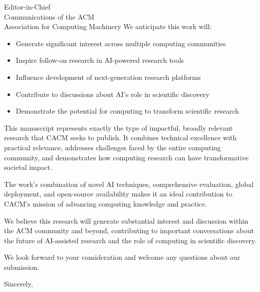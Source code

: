 \documentclass[11pt]{letter}
\begin{document}
\begin{letter}{Editor-in-Chief\\
Communications of the ACM\\
Association for Computing Machinery}
We anticipate this work will:

\begin{itemize}
    \item Generate significant interest across multiple computing communities
    \item Inspire follow-on research in AI-powered research tools
    \item Influence development of next-generation research platforms
    \item Contribute to discussions about AI's role in scientific discovery
    \item Demonstrate the potential for computing to transform scientific research
\end{itemize}

This manuscript represents exactly the type of impactful, broadly relevant research that CACM seeks to publish. It combines technical excellence with practical relevance, addresses challenges faced by the entire computing community, and demonstrates how computing research can have transformative societal impact.

The work's combination of novel AI techniques, comprehensive evaluation, global deployment, and open-source availability makes it an ideal contribution to CACM's mission of advancing computing knowledge and practice.

We believe this research will generate substantial interest and discussion within the ACM community and beyond, contributing to important conversations about the future of AI-assisted research and the role of computing in scientific discovery.

We look forward to your consideration and welcome any questions about our submission.

\closing{Sincerely,}

\end{letter}
\end{document}
